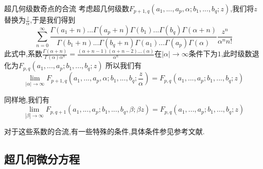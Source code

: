 \documentclass[zihao=-4,a4paper]{ctexart}
\begin{document}
\begin{mtheorem}{超几何级数奇点的合流}
	考虑超几何级数$ {F}_{ {p} + {1} , {q} } \left( {a}_{1} , ... , {a}_{p} , {\alpha} ; {b}_{1} , ... , {b}_{q} ; {z} \right) $,我们将$ {z} $替换为$ \frac{z}{\alpha}$,于是我们得到
	\begin{equation*}
		\sum^{\infty}_{n=0} \frac{ {\Gamma} \left( {a}_{1} + {n} \right) ... {\Gamma} \left( {a}_{p} + {n} \right) {\Gamma} \left( {b}_{1} \right) ... {\Gamma} \left( {b}_{q} \right) {\Gamma} \left( {\alpha} + {n} \right) }{ {\Gamma} \left( {b}_{1} + {n} \right) ... {\Gamma} \left( {b}_{q} + {n} \right) {\Gamma} \left( {a}_{1} \right) ... {\Gamma} \left( {a}_{p} \right) {\Gamma} \left( {\alpha} \right)} \frac{ {z}^{n} }{ {\alpha}^{n} {n}!}
	\end{equation*}
	此式中,系数$ \frac{ {\Gamma} \left( {\alpha} + {n} \right) }{ {\Gamma} \left( {\alpha} \right) {\alpha}^{n} } = \frac{ \left( {\alpha} + {n} - {1} \right) \left( {\alpha} + {n} - {2} \right) ... \left( {\alpha} \right) }{ {\alpha}^{n} } $在$ \left| {\alpha} \right| {\to} {\infty} $条件下为$1$,此时级数退化为$ {F}_{ {p} , {q} } \left( {a}_{1} , ... , {a}_{p} ; {b}_{1} , ... , {b}_{q} ; {z} \right)$
	所以我们有
	\begin{equation}
		\lim_{ \left| {\alpha} \right| {\to} {\infty} } {F}_{ {p} + {1} , {q} } \left( {a}_{1} , ... , {a}_{p} , {\alpha} ; {b}_{1} , ... , {b}_{q} ; \frac{z}{\alpha} \right) = {F}_{ {p} , {q} } \left( {a}_{1} , ... , {a}_{p} ; {b}_{1} , ... , {b}_{q} ; {z} \right)
	\end{equation}

	同样地,我们有
	\begin{equation}
		\lim_{ \left| {\beta} \right| {\to} {\infty} } {F}_{ {p} , {q} + {1} } \left( {a}_{1} , ... , {a}_{p} ; {b}_{1} , ... , {b}_{q} , {\beta} ; {\beta}{z} \right) = {F}_{ {p} , {q} } \left( {a}_{1} , ... , {a}_{p} ; {b}_{1} , ... , {b}_{q} ; {z} \right)
	\end{equation}

	对于这些系数的合流,有一些特殊的条件,具体条件参见参考文献.
\end{mtheorem}

\subsection{超几何微分方程}
\end{document}
